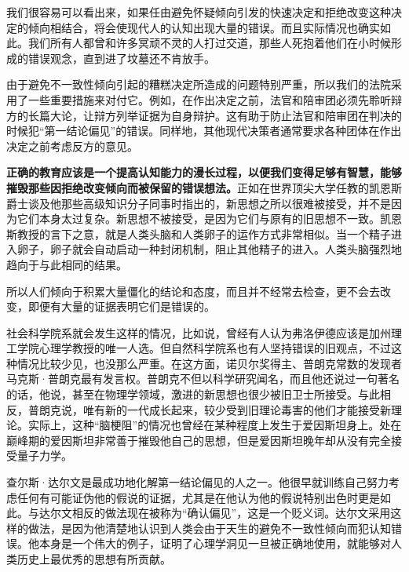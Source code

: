 我们很容易可以看出来，如果任由避免怀疑倾向引发的快速决定和拒绝改变这种决定的倾向相结合，将会使现代人的认知出现大量的错误。而且实际情况也确实如此。我们所有人都曾和许多冥顽不灵的人打过交道，那些人死抱着他们在小时候形成的错误观念，直到进了坟墓还不肯放手。
\par

由于避免不一致性倾向引起的糟糕决定所造成的问题特别严重，所以我们的法院采用了一些重要措施来对付它。例如，在作出决定之前，法官和陪审团必须先聆听辩方的长篇大论，让辩方列举证据为自身辩护。这有助于防止法官和陪审团在判决的时候犯“第一结论偏见”的错误。同样地，其他现代决策者通常要求各种团体在作出决定之前考虑反方的意见。
\par

\textbf{正确的教育应该是一个提高认知能力的漫长过程，以便我们变得足够有智慧，能够摧毁那些因拒绝改变倾向而被保留的错误想法。}正如在世界顶尖大学任教的凯恩斯爵士谈及他那些高级知识分子同事时指出的，新思想之所以很难被接受，并不是因为它们本身太过复杂。新思想不被接受，是因为它们与原有的旧思想不一致。凯恩斯教授的言下之意，就是人类头脑和人类卵子的运作方式非常相似。当一个精子进入卵子，卵子就会自动启动一种封闭机制，阻止其他精子的进入。人类头脑强烈地趋向于与此相同的结果。
\par

所以人们倾向于积累大量僵化的结论和态度，而且并不经常去检查，更不会去改变，即便有大量的证据表明它们是错误的。
\par

社会科学院系就会发生这样的情况，比如说，曾经有人认为弗洛伊德应该是加州理工学院心理学教授的唯一人选。但自然科学院系也有人坚持错误的旧观点，不过这种情况比较少见，也没那么严重。在这方面，诺贝尔奖得主、普朗克常数的发现者马克斯·普朗克最有发言权。普朗克不但以科学研究闻名，而且他还说过一句著名的话，他说，甚至在物理学领域，激进的新思想也很少被旧卫士所接受。与此相反，普朗克说，唯有新的一代成长起来，较少受到旧理论毒害的他们才能接受新理论。实际上，这种“脑梗阻”的情况也曾经在某种程度上发生于爱因斯坦身上。处在巅峰期的爱因斯坦非常善于摧毁他自己的思想，但是爱因斯坦晚年却从没有完全接受量子力学。
\par

查尔斯·达尔文是最成功地化解第一结论偏见的人之一。他很早就训练自己努力考虑任何有可能证伪他的假说的证据，尤其是在他认为他的假说特别出色时更是如此。与达尔文相反的做法现在被称为“确认偏见”，这是一个贬义词。达尔文采用这样的做法，是因为他清楚地认识到人类会由于天生的避免不一致性倾向而犯认知错误。他本身是一个伟大的例子，证明了心理学洞见一旦被正确地使用，就能够对人类历史上最优秀的思想有所贡献。
\par

